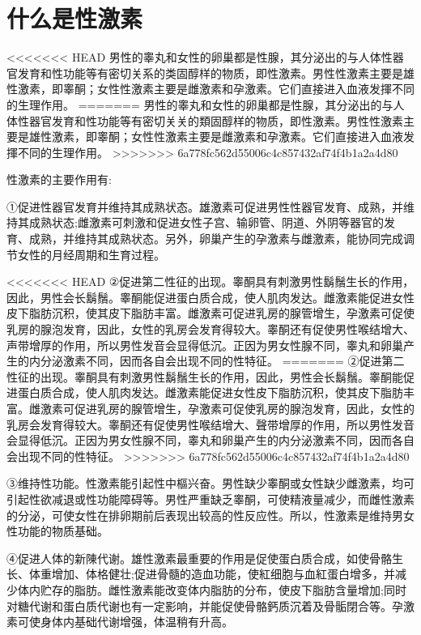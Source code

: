 \documentclass[12pt,UTF8]{ctexbook}
\begin{document}
\section{什么是性激素}

<<<<<<< HEAD
男性的睾丸和女性的卵巢都是性腺，其分泌出的与人体性器官发育和性功能等有密切关系的类固醇样的物质，即性激素。男性性激素主要是雄性激素，即睾酮；女性性激素主要是雌激素和孕激素。它们直接进入血液发揮不同的生理作用。
=======
男性的睾丸和女性的卵巢都是性腺，其分泌出的与人体性器官发育和性功能等有密切关关的類固醇样的物质，即性激素。男性性激素主要是雄性激素，即睾酮；女性性激素主要是雌激素和孕激素。它们直接进入血液发揮不同的生理作用。
>>>>>>> 6a778fc562d55006c4c857432af74f4b1a2a4d80

性激素的主要作用有:

①促进性器官发育并维持其成熟状态。雄激素可促进男性性器官发育、成熟，并维持其成熟状态;雌激素可刺激和促进女性子宫、输卵管、阴道、外阴等器官的发育、成熟，并维持其成熟状态。另外，卵巢产生的孕激素与雌激素，能协同完成调节女性的月经周期和生育过程。

<<<<<<< HEAD
②促进第二性征的出现。睾酮具有刺激男性鬍鬚生长的作用，因此，男性会长鬍鬚。睾酮能促进蛋白质合成，使人肌肉发达。雌激素能促进女性皮下脂肪沉积，使其皮下脂肪丰富。雌激素可促进乳房的腺管增生，孕激素可促使乳房的腺泡发育，因此，女性的乳房会发育得较大。睾酮还有促使男性喉结增大、声带增厚的作用，所以男性发音会显得低沉。正因为男女性腺不同，睾丸和卵巢产生的内分泌激素不同，因而各自会出现不同的性特征。
=======
②促进第二性征的出现。睾酮具有刺激男性鬍鬚生长的作用，因此，男性会长鬍鬚。睾酮能促进蛋白质合成，使人肌肉发达。雌激素能促进女性皮下脂肪沉积，使其皮下脂肪丰富。雌激素可促进乳房的腺管增生，孕激素可促使乳房的腺泡发育，因此，女性的乳房会发育得较大。睾酮还有促使男性喉结增大、聲带增厚的作用，所以男性发音会显得低沉。正因为男女性腺不同，睾丸和卵巢产生的内分泌激素不同，因而各自会出现不同的性特征。
>>>>>>> 6a778fc562d55006c4c857432af74f4b1a2a4d80

③维持性功能。性激素能引起性中樞兴奋。男性缺少睾酮或女性缺少雌激素，均可引起性欲减退或性功能障碍等。男性严重缺乏睾酮，可使精液量减少，而雌性激素的分泌，可使女性在排卵期前后表现出较高的性反应性。所以，性激素是维持男女性功能的物质基础。

④促进人体的新陳代谢。雄性激素最重要的作用是促使蛋白质合成，如使骨骼生长、体重增加、体格健壮;促进骨髓的造血功能，使紅细胞与血紅蛋白增多，并减少体内贮存的脂肪。雌性激素能改变体内脂肪的分布，使皮下脂肪含量增加;同时对糖代谢和蛋白质代谢也有一定影响，并能促使骨骼鈣质沉着及骨骺閉合等。孕激素可使身体内基础代谢增强，体温稍有升高。
\end{document}
